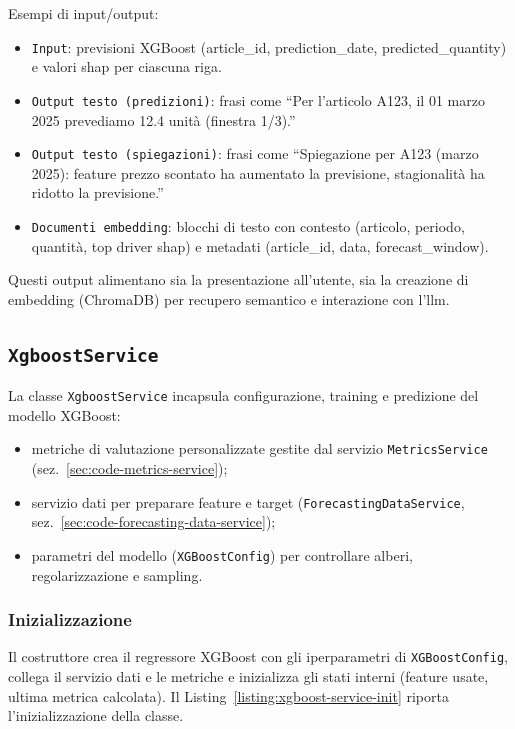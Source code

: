 Esempi di input/output:
\begin{itemize}
    \item \texttt{Input}: previsioni XGBoost (article\_id, prediction\_date, predicted\_quantity) e valori \acrshort{shap} per ciascuna riga.
    \item \texttt{Output testo (predizioni)}: frasi come “Per l’articolo A123, il 01 marzo 2025 prevediamo 12.4 unità (finestra 1/3).”
    \item \texttt{Output testo (spiegazioni)}: frasi come “Spiegazione per A123 (marzo 2025): feature prezzo scontato ha aumentato la previsione, stagionalità ha ridotto la previsione.”
    \item \texttt{Documenti embedding}: blocchi di testo con contesto (articolo, periodo, quantità, top driver \acrshort{shap}) e metadati (article\_id, data, forecast\_window).
\end{itemize}

Questi output alimentano sia la presentazione all’utente, sia la creazione di \gls{embedding} (ChromaDB) per recupero semantico e interazione con l’\acrshort{llm}.

\subsection{\texttt{XgboostService}}
\label{sec:code-xgboost-service}
La classe \texttt{XgboostService} incapsula configurazione, training e predizione del modello XGBoost:
\begin{itemize}
    \item metriche di valutazione personalizzate gestite dal servizio \texttt{MetricsService} (sez.~\ref{sec:code-metrics-service});
    \item servizio dati per preparare feature e target (\texttt{ForecastingDataService}, sez.~\ref{sec:code-forecasting-data-service});
    \item parametri del modello (\texttt{XGBoostConfig}) per controllare alberi, regolarizzazione e sampling.
\end{itemize}
\subsubsection{Inizializzazione}
Il costruttore crea il regressore XGBoost con gli iperparametri di \texttt{XGBoostConfig}, collega il servizio dati e le metriche e inizializza gli stati interni (feature usate, ultima metrica calcolata).
Il Listing~\ref{listing:xgboost-service-init} riporta l’inizializzazione della classe.
\captionsetup{type=listing, belowskip=0pt}
\inputminted[fontsize=\small, breaklines, breakanywhere=true, linenos=true, bgcolor=gray!10]{python}{code/services/init/xgboost_service_init.py}
\label{listing:xgboost-service-init}

